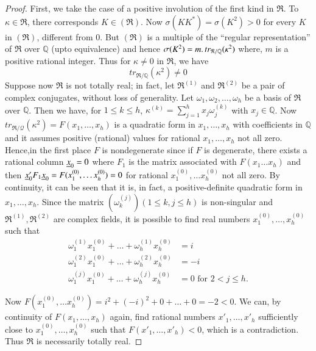 \begin{proof}
First, we take the case of a positive involution of the first kind in
$\mathfrak{R}$. To $\kappa \in \mathfrak{R}$, there corresponds $K \in
(\mathfrak{R})$. Now $\sigma (K K^{\ast}) = \sigma (K^2) > 0$ for
every $K$ in $(\mathfrak{R})$, different from $0$. But
$(\mathfrak{R})$ is a multiple of the ``regular representation'' of
$\mathfrak{R}$ over $\mathbb{Q}$ (upto equivalence) and hence
$\sigma(K^2) = m\ldotp tr_{\mathfrak{R}/\mathbb{Q}}(\kappa^2)$ where,
$m$ is a positive rational integer. Thus for $\kappa \neq 0$ in
$\mathfrak{R}$, we have
\begin{equation*}
tr_{\mathfrak{R}/\mathbb{Q}} (\kappa^2) \neq 0 \tag{17}\label{eq17}
\end{equation*}
Suppose now $\mathfrak{R}$ is not totally real; in fact, let
$\mathfrak{R}^{(1)}$ and $\mathfrak{R}^{(2)}$ be a pair of complex
conjugates, without loss of generality. Let $\omega_1, \omega_2,
\ldots, \omega_h$ be a basis of $\mathfrak{R}$ over
$\mathbb{Q}$. Then we have, for $1\leq k \leq h$, $\kappa^{(k)} =
\sum\limits^h_{j=1} x_j \omega^{(k)}_j$ with $x_j \in \mathbb{Q}$. Now
$tr_{\mathfrak{R}/ \mathscr{Q}}(\kappa^2) = F(x_1,\ldots, x_h)$
is a quadratic form in $x_1,\ldots, x_h$ with coefficients in
$\mathbb{Q}$ and it assumes positive (rational) values for rational
$x_1,\ldots, x_h$ not all zero.
Hence,\pageoriginale in the first place $F$ is nondegenerate since if
$F$ is degenerate, there exists a rational column $\underline{x}_0 = 0$ where
$F_1$ is the matrix associated with $F(x_1 \ldots x_h)$ and
then $\underline{x}'_0 F_1 \underline{x}_0 = F (x^{(0)}_1,\ldots x^{(0)}_h) =
0$ for rational $x^{(0)}_1, \ldots x^{(0)}_h$ not all zero. By
continuity, it can be seen that it is, in fact, a positive-definite
quadratic form in $x_1,\ldots, x_h$. Since the matrix
$(\omega^{(j)}_k) (1\leq k, j \leq h)$ is non-singular and
$\mathfrak{R}^{(1)}, \mathfrak{R}^{(2)}$ are complex fields, it is
possible to find real numbers $x^{(0)}_1,\ldots, x^{(0)}_h$
such that 
\begin{align*}
\omega^{(1)}_1  x^{(0)}_1 + \ldots + \omega^{(1)}_h x^{(0)}_h &
= i \\[5pt]
\omega^{(2)}_1 x^{(0)}_1 + \ldots + \omega^{(2)}_h x^{(0)}_h &
= -i\\[5pt]
\omega^{(j)}_1  x^{(0)}_1 + \ldots + \omega^{(j)}_h x^{(0)}_h &
= 0 \text{ for } 2 < j \leq h. 
\end{align*}

Now $F(x^{(0)}_1, \ldots x^{(0)}_h) = i^2 + (-i)^2 + 0 + \ldots + 0 =
-2 < 0$. We can, by continuity of $F(x_1,\ldots, 
x_h)$ again, find rational numbers $x'_1,\ldots, x'_h$
sufficiently close to $x^{(0)}_1, \ldots, x^{(0)}_h$ such that
$F(x'_1, \ldots, x'_h)<0$, which is a contradiction. Thus
$\mathfrak{R}$ is necessarily totally real.


\end{proof}
